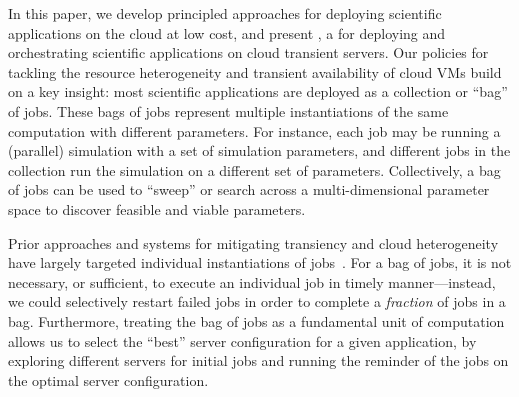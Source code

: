 In this paper, we develop principled approaches for deploying  scientific  applications on the cloud at low cost, and present \sysname, a  for deploying and orchestrating scientific applications on cloud transient servers. 
%
%
Our policies for tackling the resource heterogeneity and transient availability of cloud VMs build on a key insight: most scientific applications are deployed as a collection or ``bag'' of jobs. 
%
These bags of jobs represent multiple instantiations of the same computation with different parameters. 
%
For instance, each job may be running a (parallel) simulation with a set of simulation parameters, and different jobs in the collection run the simulation on a different set of parameters. 
Collectively, a bag of jobs can be used to ``sweep'' or search across a multi-dimensional parameter space to discover feasible and viable parameters.



Prior approaches and systems for mitigating transiency and cloud heterogeneity have largely targeted individual instantiations of jobs~\cite{spoton, exosphere, flint, marathe2014exploiting}. 
%
For a bag of jobs, it is not necessary, or sufficient, to execute an individual job in timely manner---instead, we could selectively restart failed jobs in order to complete a \emph{fraction} of jobs in a bag. 
%
Furthermore, treating the bag of jobs as a fundamental unit of computation allows us to select the ``best'' server configuration for a given application, by exploring different servers for initial jobs and running the reminder of the jobs on the optimal server configuration. 


